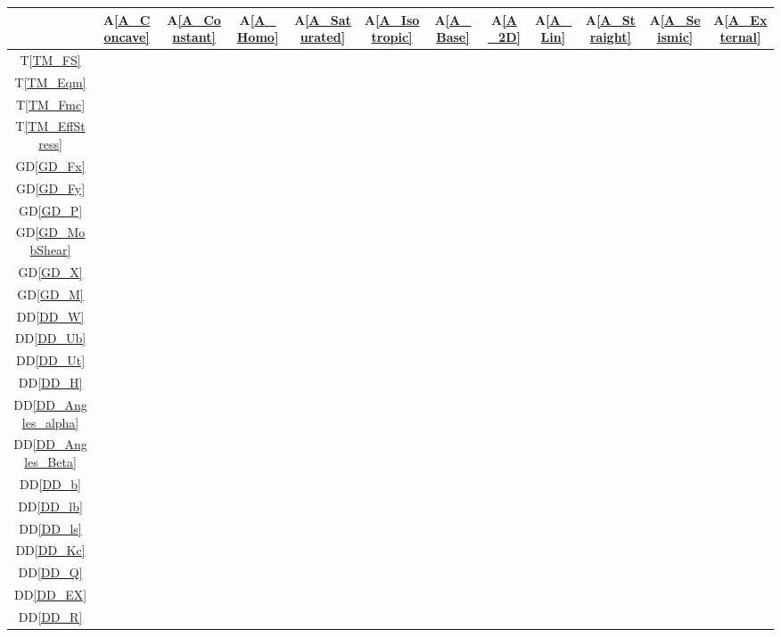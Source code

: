 \documentclass[12pt]{article}
\newcommand{\aref}[1]{A\ref{#1}}
\newcommand{\tref}[1]{T\ref{#1}}
\newcommand{\ddref}[1]{DD\ref{#1}}
\newcommand{\dref}[1]{GD\ref{#1}}
\begin{document}
\setlength{\tabcolsep}{6pt}

\begin{table}[h!]
\centering
\begin{tabular}{|c|c|c|c|c|c|c|c|c|c|c|c|}
\hline
& \aref{A_Concave}& \aref{A_Constant}& \aref{A_Homo}& \aref{A_Saturated}&
\aref{A_Isotropic}& \aref{A_Base}& \aref{A_2D}& \aref{A_Lin}& 
\aref{A_Straight}& \aref{A_Seismic}& \aref{A_External} \\
\hline
\tref{TM_FS}            & & & & & & & & & & & \\ \hline
\tref{TM_Eqm}           & & & & & & & & & & & \\ \hline
\tref{TM_Fmc}           & & & & & & & & & & & \\ \hline
\tref{TM_EffStress}     & & & & & & & & & & & \\ \hline
\dref{GD_Fx}            & & & & & & & & & & & \\ \hline
\dref{GD_Fy}            & & & & & & & & & & & \\ \hline
\dref{GD_P}             & & & & & & & & & & & \\ \hline
\dref{GD_MobShear}      & & & & & & & & & & & \\ \hline
\dref{GD_X}             & & & & & & & & & & & \\ \hline
\dref{GD_M}             & & & & & & & & & & & \\ \hline
\ddref{DD_W}            & & & & & & & & & & & \\ \hline
\ddref{DD_Ub}           & & & & & & & & & & & \\ \hline
\ddref{DD_Ut}           & & & & & & & & & & & \\ \hline
\ddref{DD_H}            & & & & & & & & & & & \\ \hline
\ddref{DD_Angles_alpha} & & & & & & & & & & & \\ \hline
\ddref{DD_Angles_Beta}  & & & & & & & & & & & \\ \hline
\ddref{DD_b}            & & & & & & & & & & & \\ \hline
\ddref{DD_lb}           & & & & & & & & & & & \\ \hline
\ddref{DD_ls}           & & & & & & & & & & & \\ \hline
\ddref{DD_Kc}           & & & & & & & & & & & \\ \hline
\ddref{DD_Q}            & & & & & & & & & & & \\ \hline
\ddref{DD_EX}           & & & & & & & & & & & \\ \hline
\ddref{DD_R}            & & & & & & & & & & & \\ \hline

\end{tabular}
\end{table}
\end{document}
